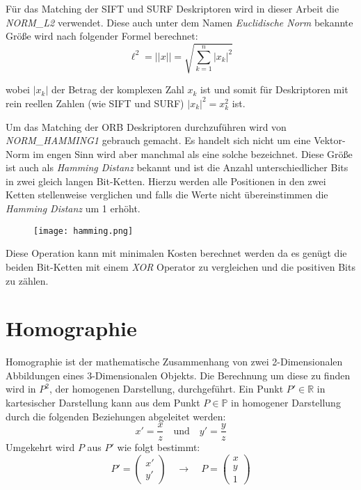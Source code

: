 Für das Matching der SIFT und SURF Deskriptoren wird in dieser Arbeit die \emph{NORM\_L2} verwendet.
Diese auch unter dem Namen \emph{Euclidische Norm} bekannte Größe wird nach folgender Formel berechnet:
\begin{equation}
\ell^2 = ||x|| = \sqrt{\sum_{k=1}^{n}|x_k|^2}
\end{equation}

wobei $|x_k|$ der Betrag der komplexen Zahl $x_k$ ist und somit für Deskriptoren mit rein reellen Zahlen (wie SIFT und SURF) $|x_k|^2 = x_k^2$ ist.

Um das Matching der ORB Deskriptoren durchzuführen wird von \emph{NORM\_HAMMING1} gebrauch gemacht.
Es handelt sich nicht um eine Vektor-Norm im engen Sinn wird aber manchmal als eine solche bezeichnet.
Diese Größe ist auch als \emph{Hamming Distanz} bekannt und ist die Anzahl unterschiedlicher Bits in zwei gleich langen Bit-Ketten.
Hierzu werden alle Positionen in den zwei Ketten stellenweise verglichen und falls die Werte nicht übereinstimmen die \emph{Hamming Distanz} um 1 erhöht.

\begin{figure}[h]
\texttt{[image: hamming.png]}
\centering
\end{figure}

Diese Operation kann mit minimalen Kosten berechnet werden da es genügt die beiden Bit-Ketten mit einem \emph{XOR} Operator zu vergleichen und die positiven Bits zu zählen.
\section{Homographie}
Homographie ist der mathematische Zusammenhang von zwei 2-Dimensionalen Abbildungen eines 3-Dimensionalen Objekts.
Die Berechnung um diese zu finden wird in $P^2$, der homogenen Darstellung, durchgeführt.
Ein Punkt $P'\in \mathbb{R}$ in kartesischer Darstellung kann aus dem Punkt $P \in \mathbb{P}$ in homogener Darstellung durch die folgenden Beziehungen abgeleitet werden:
\begin{equation}
x' = \dfrac{x}{z} \quad \text{und} \quad y' = \dfrac{y}{z}
\end{equation}
Umgekehrt wird $P$ aus $P'$ wie folgt bestimmt:
\begin{equation}
P' = 
\begin{pmatrix}
    x'\\
    y'
\end{pmatrix}
\quad \rightarrow \quad
P = 
\begin{pmatrix}
    x\\
    y\\
    1
\end{pmatrix}
\end{equation}

